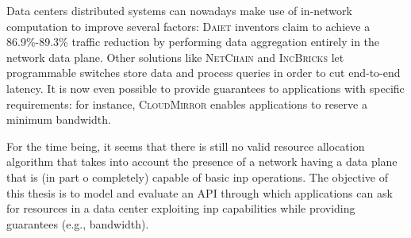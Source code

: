 Data centers distributed systems can nowadays make use of in-network computation to improve several factors: \textsc{Daiet} \cite{daiet} inventors claim to achieve a 86.9\%-89.3\% traffic reduction by performing data aggregation entirely in the network data plane.
Other solutions like \textsc{NetChain} \cite{netchain} and \textsc{IncBricks} \cite{incbricks} let programmable switches store data and process queries in order to cut end-to-end latency.
It is now even possible to provide guarantees to applications with specific requirements: for instance, \textsc{CloudMirror} \cite{cloudmirror} enables applications to reserve a minimum bandwidth.\par
For the time being, it seems that there is still no valid resource allocation algorithm that takes into account the presence of a network having a data plane that is (in part o completely) capable of basic \gls{inp} operations.
The objective of this thesis is to model and evaluate an API through which applications can ask for resources in a data center exploiting \gls{inp} capabilities while providing guarantees (e.g., bandwidth).